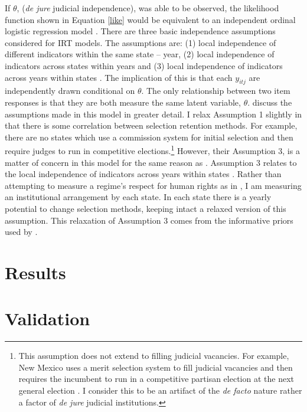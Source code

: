 \documentclass[12pt]{article}
\begin{document}
If $\theta$, (\textit{de jure} judicial independence), was able to be observed, the likelihood function shown in Equation \ref{like} would be equivalent to an independent ordinal logistic regression model \citep[8]{Schnakenberg2014}.  There are three basic independence assumptions considered for IRT models.  The assumptions are: (1) local independence of different indicators within the same state -- year, (2) local independence of indicators across states within years and (3) local independence of indicators across years within states \citep[8]{Schnakenberg2014}.  The implication of this is that each $y_{itj}$ are independently drawn conditional on $\theta$.  The only relationship between two item responses is that they are both measure the same latent variable, $\theta$. \citet[8]{Schnakenberg2014} discuss the assumptions made in this model in greater detail.  I relax Assumption 1 slightly in that there is some correlation between selection retention methods. For example, there are no states which use a commission system for initial selection and then require judges to run in competitive elections.\footnote{This assumption does not extend to filling judicial vacancies.  For example, New Mexico uses a merit selection system to fill judicial vacancies and then requires the incumbent to run in a competitive partisan election at the next general election \citep{AJS}.  I consider this to be an artifact of the \textit{de facto} nature rather a factor of \textit{de jure} judicial institutions.}  However, their Assumption 3, is a matter of concern in this model for the same reason as \citep{Schnakenberg2014}.  Assumption 3 relates to the local independence of indicators across years within states \citep[8]{Schnakenberg2014}.  Rather than attempting to measure a regime's respect for human rights as in \citet{Schnakenberg2014}, I am measuring an institutional arrangement by each state.  In each state there is a yearly potential to change selection methods, keeping intact a relaxed version of this assumption.  This relaxation of Assumption 3 comes from the informative priors used by \citet[8]{Schnakenberg2014}.    

\section{Results}\label{Results}


\section{Validation}\label{Validation}

\end{document}
